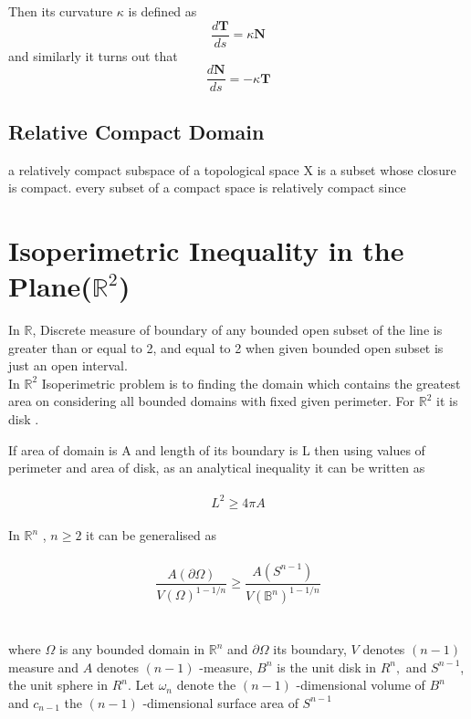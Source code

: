 \documentclass[oneside]{book}
\theoremstyle{definition}
\begin{document}
  Then its curvature $\kappa$ is defined as
  \begin{equation}
  \label{eq3}  
    \frac{d \mathbf{T}}{d s}=\kappa \mathbf{N}
\end{equation}  and similarly it turns out that \begin{equation}
\label{eq4}  
    \frac{d \mathbf{N}}{d s}=-\kappa \mathbf{T}
\end{equation}

\subsection{Relative Compact Domain} \label{ss:2}
a relatively compact subspace of a topological space X is a subset whose closure is compact.
every subset of a compact space is relatively compact since
    \







\section{\textbf{Isoperimetric Inequality in the Plane($\mathbb{R}^{2}$)}}
\label{s:3}
 In $\mathbb{R}$, Discrete measure of boundary of any bounded open subset of the line is greater than or equal to 2, and equal to 2 when given bounded open subset is just an open interval.\\
  In $\mathbb{R}^{2}$ Isoperimetric problem is to finding the domain which contains the greatest area on considering  all bounded domains with fixed given perimeter. For $\mathbb{R}^{2}$ it is disk . 

    If area of domain is A and length of its boundary is L then using values of perimeter and area of disk,
    as an analytical inequality it can be written as \\\\
    \begin{equation}
    \label{eq5}  
    L^{2} \geq 4 \pi A
        \end{equation}
      \\
        In $\mathbb{R}^{n}$ 
        , $n \geq 2$  it can be generalised as
        \\\\
       \begin{equation}
       \label{eq6}  
             \frac{A(\partial \Omega)}{V(\Omega)^{1-1 / n}} \geq \frac{A\left(S^{n-1}\right)}{V\left(\mathbb{B}^{n}\right)^{1-1 / n}}
          \end{equation} \\\\
        where $\Omega$ is any bounded domain in $\mathbb{R}^{n}$ and $\partial \Omega$ its boundary, $V$ denotes $(n-1)$
measure and $A$ denotes $(n-1)$ -measure, $B^{n}$ is the unit disk in $R^{n},$ and $S^{n-1}$,
the unit sphere in $R^{n}$.
Let $\omega_{n}$ denote the $(n-1)$ -dimensional volume of $B^{n}$ and  $c_{n-1}$ the $(n-1)$ -dimensional surface area of $S^{n-1}$ \\\\
\end{document}

